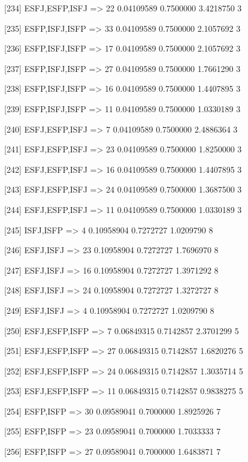 [234] {ESFJ,ESFP,ISFJ}      => {22} 0.04109589 0.7500000  3.4218750  3   

[235] {ESFP,ISFJ,ISFP}      => {33} 0.04109589 0.7500000  2.1057692  3   

[236] {ESFP,ISFJ,ISFP}      => {17} 0.04109589 0.7500000  2.1057692  3   

[237] {ESFP,ISFJ,ISFP}      => {27} 0.04109589 0.7500000  1.7661290  3   

[238] {ESFP,ISFJ,ISFP}      => {16} 0.04109589 0.7500000  1.4407895  3   

[239] {ESFP,ISFJ,ISFP}      => {11} 0.04109589 0.7500000  1.0330189  3   

[240] {ESFJ,ESFP,ISFJ}      => {7}  0.04109589 0.7500000  2.4886364  3   

[241] {ESFJ,ESFP,ISFJ}      => {23} 0.04109589 0.7500000  1.8250000  3   

[242] {ESFJ,ESFP,ISFJ}      => {16} 0.04109589 0.7500000  1.4407895  3   

[243] {ESFJ,ESFP,ISFJ}      => {24} 0.04109589 0.7500000  1.3687500  3   

[244] {ESFJ,ESFP,ISFJ}      => {11} 0.04109589 0.7500000  1.0330189  3   

[245] {ISFJ,ISFP}           => {4}  0.10958904 0.7272727  1.0209790  8   

[246] {ESFJ,ISFJ}           => {23} 0.10958904 0.7272727  1.7696970  8   

[247] {ESFJ,ISFJ}           => {16} 0.10958904 0.7272727  1.3971292  8   

[248] {ESFJ,ISFJ}           => {24} 0.10958904 0.7272727  1.3272727  8   

[249] {ESFJ,ISFJ}           => {4}  0.10958904 0.7272727  1.0209790  8   

[250] {ESFJ,ESFP,ISFP}      => {7}  0.06849315 0.7142857  2.3701299  5   

[251] {ESFJ,ESFP,ISFP}      => {27} 0.06849315 0.7142857  1.6820276  5   

[252] {ESFJ,ESFP,ISFP}      => {24} 0.06849315 0.7142857  1.3035714  5   

[253] {ESFJ,ESFP,ISFP}      => {11} 0.06849315 0.7142857  0.9838275  5   

[254] {ESFP,ISFP}           => {30} 0.09589041 0.7000000  1.8925926  7   

[255] {ESFP,ISFP}           => {23} 0.09589041 0.7000000  1.7033333  7   

[256] {ESFP,ISFP}           => {27} 0.09589041 0.7000000  1.6483871  7   

